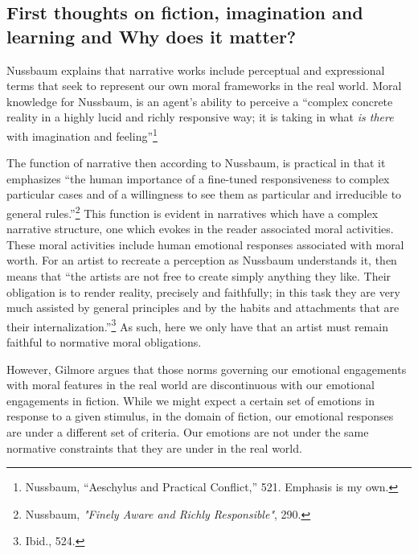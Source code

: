 \documentclass[
  12pt,
]{book}
\theoremstyle{definition}
\theoremstyle{definition}
\theoremstyle{definition}
\theoremstyle{definition}
\theoremstyle{remark}
\begin{document}
\subsection*{First thoughts on fiction, imagination and learning and Why does it matter?}\label{first-thoughts-on-fiction-imagination-and-learning-and-why-does-it-matter}

Nussbaum explains that narrative works include perceptual and expressional terms that seek to represent our own moral frameworks in the real world. Moral knowledge for Nussbaum, is an agent's ability to perceive a ``complex concrete reality in a highly lucid and richly responsive way; it is taking in what \emph{is there} with imagination and feeling''\footnote{Nussbaum, {``Aeschylus and Practical Conflict,''} 521. Emphasis is my own.}

The function of narrative then according to Nussbaum, is practical in that it emphasizes ``the human importance of a fine-tuned responsiveness to complex particular cases and of a willingness to see them as particular and irreducible to general rules.''\footnote{Nussbaum, \emph{"{Finely Aware} and {Richly Responsible}"}, 290.} This function is evident in narratives which have a complex narrative structure, one which evokes in the reader associated moral activities. These moral activities include human emotional responses associated with moral worth. For an artist to recreate a perception as Nussbaum understands it, then means that ``the artists are not free to create simply anything they like. Their obligation is to render reality, precisely and faithfully; in this task they are very much assisted by general principles and by the habits and attachments that are their internalization.''\footnote{Ibid., 524.} As such, here we only have that an artist must remain faithful to normative moral obligations.

However, Gilmore argues that those norms governing our emotional engagements with moral features in the real world are discontinuous with our emotional engagements in fiction. While we might expect a certain set of emotions in response to a given stimulus, in the domain of fiction, our emotional responses are under a different set of criteria. Our emotions are not under the same normative constraints that they are under in the real world.
\end{document}
